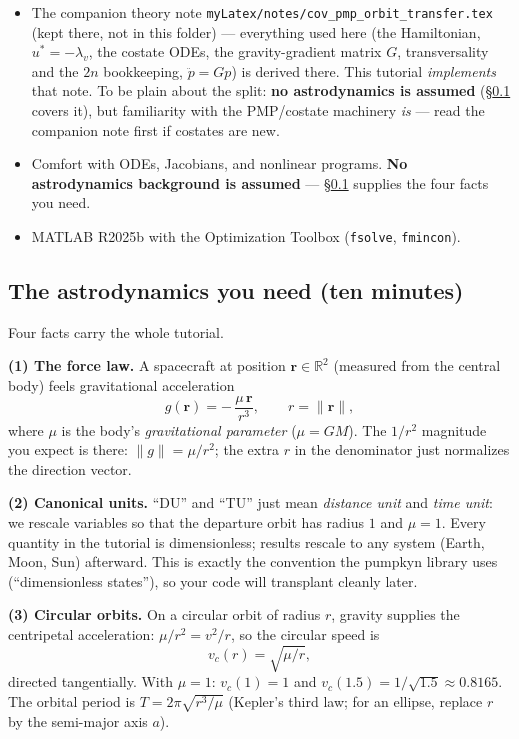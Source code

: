 \documentclass[11pt,letterpaper]{article}
\newcommand{\R}{\mathbb{R}}
\newcommand{\rvec}{\mathbf{r}}
\begin{document}
\begin{itemize}[leftmargin=*,nosep]
\item The companion theory note
  \texttt{myLatex/notes/cov\_pmp\_orbit\_transfer.tex} (kept there, not in
  this folder) --- everything used here (the Hamiltonian, $u^*=-\lambda_v$,
  the costate ODEs, the gravity-gradient matrix $G$, transversality and the
  $2n$ bookkeeping, $\ddot p = Gp$) is derived there. This tutorial
  \emph{implements} that note. To be plain about the split: \textbf{no
  astrodynamics is assumed} (\S\ref{sec:astro} covers it), but familiarity
  with the PMP/costate machinery \emph{is} --- read the companion note first
  if costates are new.
\item Comfort with ODEs, Jacobians, and nonlinear programs. \textbf{No
  astrodynamics background is assumed} --- \S\ref{sec:astro} supplies the
  four facts you need.
\item MATLAB R2025b with the Optimization Toolbox
  (\texttt{fsolve}, \texttt{fmincon}).
\end{itemize}

\subsection{The astrodynamics you need (ten minutes)}\label{sec:astro}

Four facts carry the whole tutorial.

\textbf{(1) The force law.} A spacecraft at position $\rvec \in \R^2$
(measured from the central body) feels gravitational acceleration
\[
  g(\rvec) = -\,\frac{\mu\,\rvec}{r^{3}},\qquad r = \|\rvec\|,
\]
where $\mu$ is the body's \emph{gravitational parameter} ($\mu = GM$). The
$1/r^2$ magnitude you expect is there: $\|g\| = \mu/r^2$; the extra $r$ in
the denominator just normalizes the direction vector.

\textbf{(2) Canonical units.} ``DU'' and ``TU'' just mean \emph{distance
unit} and \emph{time unit}: we rescale variables so that the departure orbit
has radius $1$ and $\mu = 1$. Every quantity in the tutorial is
dimensionless; results rescale to any system (Earth, Moon, Sun) afterward. This is exactly the convention the pumpkyn library uses
(``dimensionless states''), so your code will transplant cleanly later.

\textbf{(3) Circular orbits.} On a circular orbit of radius $r$, gravity
supplies the centripetal acceleration: $\mu/r^{2} = v^{2}/r$, so the circular
speed is
\[
  v_c(r) = \sqrt{\mu / r},
\]
directed tangentially. With $\mu=1$: $v_c(1) = 1$ and
$v_c(1.5) = 1/\sqrt{1.5} \approx 0.8165$. The orbital period is
$T = 2\pi\sqrt{r^{3}/\mu}$ (Kepler's third law; for an ellipse, replace $r$
by the semi-major axis $a$).
\end{document}
